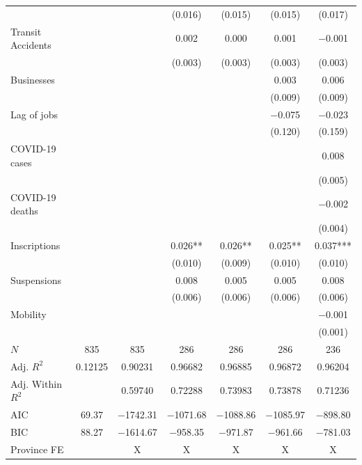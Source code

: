\documentclass[11pt,a4paper]{article}\usepackage[]{graphicx}\usepackage[]{xcolor}
\begin{document}
\begin{table}[h]
\begin{tabular}[t]{lcccccc}
 &  &  & (\num{0.016}) & (\num{0.015}) & (\num{0.015}) & (\num{0.017})\\
Transit Accidents &  &  & \num{0.002} & \num{0.000} & \num{0.001} & \num{-0.001}\\
 &  &  & (\num{0.003}) & (\num{0.003}) & (\num{0.003}) & (\num{0.003})\\
Businesses &  &  &  &  & \num{0.003} & \num{0.006}\\
 &  &  &  &  & (\num{0.009}) & (\num{0.009})\\
Lag of jobs &  &  &  &  & \num{-0.075} & \num{-0.023}\\
 &  &  &  &  & (\num{0.120}) & (\num{0.159})\\
COVID-19 cases &  &  &  &  &  & \num{0.008}\\
 &  &  &  &  &  & (\num{0.005})\\
COVID-19 deaths &  &  &  &  &  & \num{-0.002}\\
 &  &  &  &  &  & (\num{0.004})\\
Inscriptions &  &  & \num{0.026}** & \num{0.026}** & \num{0.025}** & \num{0.037}***\\
 &  &  & (\num{0.010}) & (\num{0.009}) & (\num{0.010}) & (\num{0.010})\\
Suspensions &  &  & \num{0.008} & \num{0.005} & \num{0.005} & \num{0.008}\\
 &  &  & (\num{0.006}) & (\num{0.006}) & (\num{0.006}) & (\num{0.006})\\
Mobility &  &  &  &  &  & \num{-0.001}\\
 &  &  &  &  &  & (\num{0.001})\\
\midrule
$N$ & \num{835} & \num{835} & \num{286} & \num{286} & \num{286} & \num{236}\\
Adj. $R^2$ & \num{0.12125} & \num{0.90231} & \num{0.96682} & \num{0.96885} & \num{0.96872} & \num{0.96204}\\
Adj. Within $R^2$ &  & \num{0.59740} & \num{0.72288} & \num{0.73983} & \num{0.73878} & \num{0.71236}\\
AIC & \num{69.37} & \num{-1742.31} & \num{-1071.68} & \num{-1088.86} & \num{-1085.97} & \num{-898.80}\\
BIC & \num{88.27} & \num{-1614.67} & \num{-958.35} & \num{-971.87} & \num{-961.66} & \num{-781.03}\\
Province FE &  & X & X & X & X & X\\
\bottomrule
\end{tabular}


\end{table}
\end{document}
